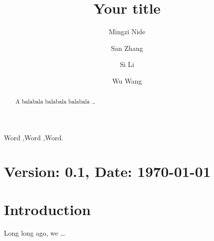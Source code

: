 \documentclass[3p, a4paper, 11pt]{elsarticle}
\newcommand\artversion{0.1} %
\begin{document}
\linenumbers
\begin{frontmatter}
    \title{Your title}
    \author[home]{Mingzi Nide}
    \author[home]{San Zhang}
    \author[home]{Si Li}
    \author[coop]{Wu Wang}
    \address[home]{School of Mathematics and Statistics,
        Northwestern Polytechnical University, Xi'an 710072, China}
    \address[coop]{Another School of Mathematics and Statistics,
        Northwestern Polytechnical University, Xi'an 710072, China}
    \begin{abstract}
        A balabala balabala balabala \dots
    \end{abstract}
    \begin{keyword}
        {Word \sep Word \sep Word.}
    \end{keyword}
\end{frontmatter}


\section*{Version: \artversion, Date: \today} %


\section{Introduction}\label{sec:introduction}
Long long ago, we \dots \cite{coussy1995mechanics,shen2021peridynamic}
\end{document}
